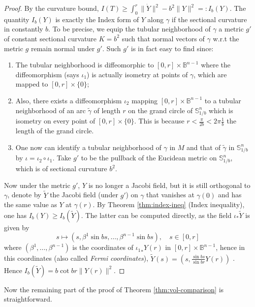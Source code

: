 \begin{proof}
By the curvature bound, \(I(T) \geq \int_0^r \| \dot Y\|^2 -b^2 \|Y\|^2=:I_b(Y)\). The
quantity \(I_b(Y)\) is exactly the Index form of \(Y\) along \(\gamma\) if the
sectional curvature in constantly \(b\). To be precise, we equip the tubular
neighborhood of \(\gamma\) a metric \(g'\) of constant sectional curvature \(K=b^2\)
such that normal vectors of \(\gamma\) w.r.t the metric \(g\) remain normal under \(g'\). Such \(g'\) is in fact easy to find since: 
\begin{enumerate}
\item The tubular neighborhood is diffeomorphic to
\([0,r]\times \mathbb{B}^{n-1}\) where the diffeomorphism (says \(\iota_1\)) is actually isometry at points
of \(\gamma\), which are mapped to \([0,r]\times \{0\}\);
\item Also, there exists a diffeomorphism \(\iota_2\) mapping \([0,r]\times\mathbb{B}^{n-1}\) to a tubular neighborhood of an arc \(\tilde\gamma\) of length \(r\) on the grand
circle of \(\mathbb{S}^n_{1/b}\) which is isometry on every point of
\([0,r]\times \{0\}\). This is because \(r < \frac{\pi}{2b} < 2\pi \frac{1}{b}\) the length
of the grand circle.
\item One now can identify a tubular neighborhood of \(\gamma\) in \(M\) and that of \(\tilde \gamma\) in \(\mathbb{S}^n_{1/b}\) by \(\iota = \iota_2\circ\iota_1\). Take
\(g'\) to be the pullback of the Eucidean metric on \(\mathbb{S}^n_{1/b}\), which is of sectional curvature \(b^2\).
\end{enumerate}

Now under the metric \(g'\), \(Y\) is no longer a Jacobi field, but it is still
orthogonal to \(\gamma\), denote by \(\tilde Y\) the Jacobi field (under \(g'\)) on
\(\gamma\) that vanishes at \(\gamma(0)\) and has the same value as \(Y\) at \(\gamma(r)\). By Theorem \ref{thm:index-ineq} (Index inequality), one has \(I_b(Y)
\geq I_b(\tilde Y)\). The latter can be computed directly, as the field \(\iota_*\tilde Y\) is given by
\[
 s\mapsto (s,\beta^1\sin bs, \dots, \beta^{n-1}\sin bs), \quad s\in [0,r]
\]
where \((\beta^1,\dots,\beta^{n-1})\) is the coordinates of \({\iota_1}_* Y(r)\) in
\([0,r]\times \mathbb{B}^{n-1}\), hence in this coordinates (also called \emph{Fermi coordinates}), \(\tilde Y(s) = \left(s,\frac{\sin bs}{\sin br}Y(r)\right)\) . Hence
\(I_b(\tilde Y) = b\cot br \|Y(r) \|^2\).
\end{proof}

Now the remaining part of the proof of Theorem \ref{thm:vol-comparison} is straightforward.

